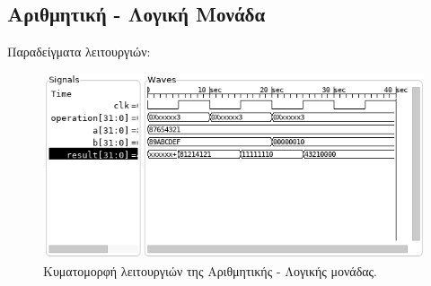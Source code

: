 \documentclass[11pt]{extarticle}
\begin{document}
\subsection{Αριθμητική - Λογική Μονάδα}
Παραδείγματα λειτουργιών:
\begin{figure}[H]
\renewcommand{\figurename}{Κυματομορφή} 
\centering
\includegraphics[scale=0.6]{diagrams/wave/alutest.png}
\caption[Κυματομορφή - Αριθμητική - Λογική Μονάδα]{Κυματομορφή λειτουργιών της Αριθμητικής - Λογικής μονάδας.}
\end{figure}
\end{document}
